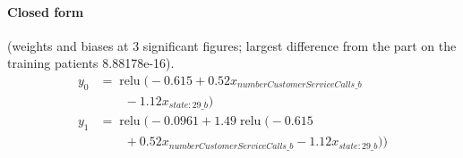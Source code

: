 \documentclass[a4paper,10pt]{article}
\newif\ifreviewmarks
\newcommand{\reviewrule}{\noindent{\color{BrickRed}\rule{\linewidth}{0.8pt}}}
\newenvironment{drafted}[1][]{%
  \ifreviewmarks\par\addvspace{\medskipamount}\reviewrule\par\nopagebreak
  \noindent{\color{BrickRed}\sffamily\footnotesize\textbf{Thesis Draft}\quad #1\hfill review}\par\nopagebreak\smallskip\fi}{%
  \ifreviewmarks\par\smallskip\noindent{\color{BrickRed}\sffamily\footnotesize end of thesis draft}\par\nopagebreak\reviewrule\par\medskip\fi}
\begin{document}
\begin{drafted}[plain-language layer: churn100-s4-c3]
\paragraph{Closed form} {\footnotesize(weights and biases at 3 significant figures; largest difference from the part on the training patients 8.88178e-16).}
{\small\begingroup\allowdisplaybreaks
\begin{align*}
y_{0} &= \operatorname{relu}\bigl(-0.615 + 0.52 x_{numberCustomerServiceCalls\_b} \\
&\qquad - 1.12 x_{state:29\_b}\bigr) \\
y_{1} &= \operatorname{relu}\bigl(-0.0961 + 1.49 \operatorname{relu}\bigl(-0.615 \\
&\qquad + 0.52 x_{numberCustomerServiceCalls\_b} - 1.12 x_{state:29\_b}\bigr)\bigr)
\end{align*}\endgroup}


\end{drafted}
\end{document}
